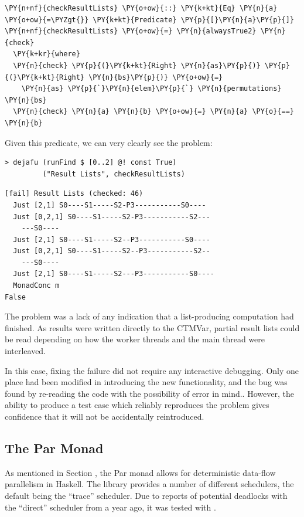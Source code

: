 \begin{Verbatim}[commandchars=\\\{\}]
\PY{n+nf}{checkResultLists} \PY{o+ow}{::} \PY{k+kt}{Eq} \PY{n}{a} \PY{o+ow}{=\PYZgt{}} \PY{k+kt}{Predicate} \PY{p}{[}\PY{n}{a}\PY{p}{]}
\PY{n+nf}{checkResultLists} \PY{o+ow}{=} \PY{n}{alwaysTrue2} \PY{n}{check}
  \PY{k+kr}{where}
  \PY{n}{check} \PY{p}{(}\PY{k+kt}{Right} \PY{n}{as}\PY{p}{)} \PY{p}{(}\PY{k+kt}{Right} \PY{n}{bs}\PY{p}{)} \PY{o+ow}{=}
    \PY{n}{as} \PY{p}{`}\PY{n}{elem}\PY{p}{`} \PY{n}{permutations} \PY{n}{bs}
  \PY{n}{check} \PY{n}{a} \PY{n}{b} \PY{o+ow}{=} \PY{n}{a} \PY{o}{==} \PY{n}{b}
\end{Verbatim}

Given this predicate, we can very clearly see the problem:

\begin{verbatim}
> dejafu (runFind $ [0..2] @! const True)
         ("Result Lists", checkResultLists)
\end{verbatim}
\begin{verbatim}
[fail] Result Lists (checked: 46)
  Just [2,1] S0----S1-----S2-P3-----------S0----
  Just [0,2,1] S0----S1-----S2-P3-----------S2---
    ---S0----
  Just [2,1] S0----S1-----S2--P3-----------S0----
  Just [0,2,1] S0----S1-----S2--P3-----------S2--
    ---S0----
  Just [2,1] S0----S1-----S2---P3-----------S0----
  MonadConc m
False
\end{verbatim}

The problem was a lack of any indication that a list-producing
computation had finished. As results were written directly to the
CTMVar, partial result lists could be read depending on how the worker
threads and the main thread were interleaved.

In this case, fixing the failure did not require any interactive
debugging. Only one place had been modified in introducing the new
functionality, and the bug was found by re-reading the code with the
possibility of error in mind.. However, the ability to produce a test
case which reliably reproduces the problem gives confidence that it
will not be accidentally reintroduced.

\subsection*{The Par Monad}
\label{sec:dejafu-example-parmonad}

As mentioned in Section , the Par monad allows for
deterministic data-flow parallelism in Haskell. The library provides a
number of different schedulers, the default being the ``trace''
scheduler. Due to reports of potential deadlocks with the ``direct''
scheduler from a year ago\cite{parreddit}, it was tested with
\dejafu{}.


